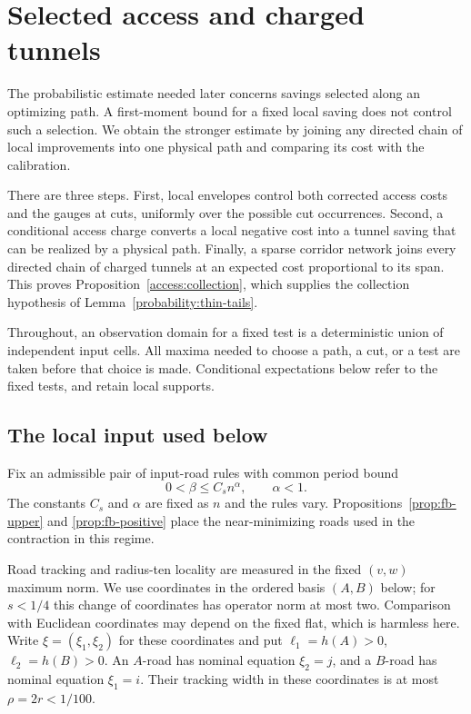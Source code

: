 \section{Selected access and charged tunnels}\label{access:section}

The probabilistic estimate needed later concerns savings selected along
an optimizing path.  A first-moment bound for a fixed local saving does
not control such a selection.  We obtain the stronger estimate by
joining any directed chain of local improvements into one physical path
and comparing its cost with the calibration.

There are three steps.  First, local envelopes control both corrected
access costs and the gauges at cuts, uniformly over the possible cut
occurrences.  Second, a conditional access charge converts a local
negative cost into a tunnel saving that can be realized by a physical
path.  Finally, a sparse corridor network joins every directed chain of
charged tunnels at an expected cost proportional to its span.  This
proves Proposition~\ref{access:collection}, which supplies the collection
hypothesis of Lemma~\ref{probability:thin-tails}.

Throughout, an observation domain for a fixed test is a deterministic
union of independent input cells.  All maxima needed to choose a path,
a cut, or a test are taken before that choice is made.  Conditional
expectations below refer to the fixed tests, and retain local supports.

\subsection{The local input used below}\label{access:local-input}

Fix an admissible pair of input-road rules with common period bound
\[
                       0<\beta\le C_s n^\alpha,
                       \qquad \alpha<1.
\]
The constants $C_s$ and $\alpha$ are fixed as $n$ and the rules vary.
Propositions~\ref{prop:fb-upper} and \ref{prop:fb-positive} place the
near-minimizing roads used in the contraction in this regime.

Road tracking and radius-ten locality are measured in the fixed
$(v,w)$ maximum norm.  We use coordinates in the ordered basis $(A,B)$
below; for $s<1/4$ this change of coordinates has operator norm at most
two.  Comparison with Euclidean coordinates may depend on the fixed flat,
which is harmless here.  Write $\xi=(\xi_1,\xi_2)$ for these coordinates and put
$\ell_1=h(A)>0$, $\ell_2=h(B)>0$.  An $A$-road has nominal equation
$\xi_2=j$, and a $B$-road has nominal equation $\xi_1=i$.  Their tracking
width in these coordinates is at most $\rho=2r<1/100$.

